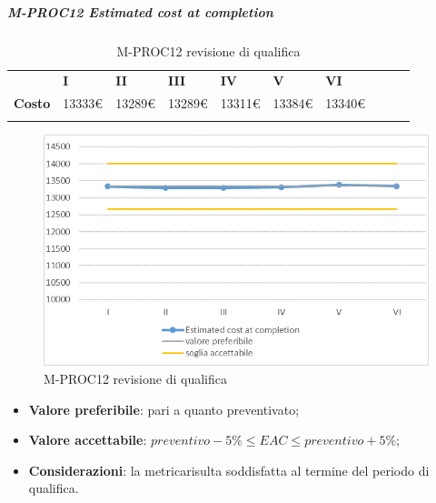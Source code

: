 \subparagraph{M-PROC12 Estimated cost at completion} \mbox{}
\begin{longtable}[H!] {						
		>{}p{25mm}  		
		>{}p{12mm}
		>{}p{12mm}		
		>{}p{12mm}		
		>{}p{12mm}		
		>{}p{12mm}		
		>{}p{12mm}
		>{}p{12mm}
		>{}p{12mm}
		>{}p{12mm}
	}
	\rowcolor{gray!50}
	\textbf{} & \textbf{I} & \textbf{II} & \textbf{III} & \textbf{IV} & \textbf{V} & \textbf{VI} \TBstrut \\ [2mm]
	\textbf{Costo} & 13333\euro & 13289\euro & 13289\euro & 13311\euro & 13384\euro & 13340\euro \TBstrut \\ [2mm]
	\rowcolor{white}
	\caption{M-PROC12 revisione di qualifica}
\end{longtable}
\begin{figure}[H] 	
	\includegraphics[width=\linewidth]{./img/grafici/RQ12.png}	
	\caption{M-PROC12 revisione di qualifica}	
\end{figure}
\begin{itemize}
	\item \textbf{Valore preferibile}: pari a quanto preventivato;
	\item \textbf{Valore accettabile}: $preventivo-5\% \le EAC \le preventivo+5\%$;
	\item \textbf{Considerazioni}: la metrica\glosp risulta soddisfatta al termine del periodo di qualifica.
\end{itemize}


